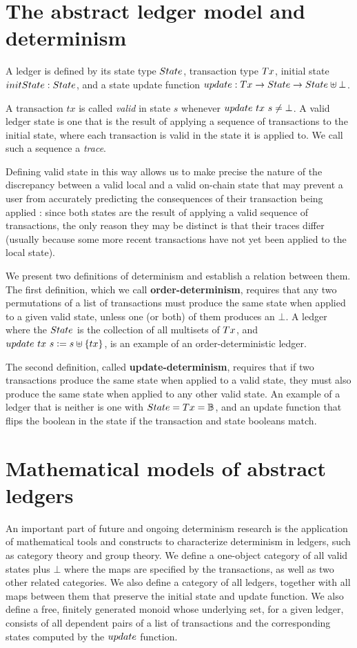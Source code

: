 \section{The abstract ledger model and determinism}
\label{sec:the-model}
A ledger is defined by its state type $\State$, transaction
type $\Tx$, initial state $\fun{initState} : \State$,
and a state update function $\ups : \Tx \to \State \to \State \uplus \bot$.

A transaction $tx$ is called \emph{valid} in state $s$ whenever $\ups\ tx\ s \neq \bot$.
A valid ledger state is one that is the result
of applying a sequence of transactions to the initial state, where each transaction
is valid in the state it is applied to. We call such a sequence a \emph{trace}.

Defining valid state in this way allows us to make precise the nature of the
discrepancy between a valid local and a valid on-chain state that may prevent a
user from accurately predicting the consequences of their transaction being applied :
since both states are the result of applying a valid sequence of transactions,
the only reason they may be distinct is that their traces differ (usually because
some more recent transactions have not yet been applied to the local state).

We present two definitions of determinism and establish a relation between them. The first definition,
which we call \textbf{order-determinism}, requires that
any two permutations of a list of transactions must produce the same state when
applied to a given valid state, unless one (or both) of them produces an $\bot$.
A ledger where the $\State$ is the collection of all multisets of $\Tx$,
and $\ups~tx~s \leteq s \uplus \{tx\}$, is
an example of an order-deterministic ledger.

The second definition, called \textbf{update-determinism}, requires that if two
transactions produce the same state
when applied to a valid state, they must also produce the same state when applied
to any other valid state. An example of a
ledger that is neither is one with $\State = \Tx = \B$,
and an update function that flips the boolean in the state if the transaction and
state booleans match.


\section{Mathematical models of abstract ledgers}
\label{sec:math}

An important part of future and ongoing determinism research is the application of
mathematical tools and constructs to characterize determinism in ledgers,
such as category theory and group theory.
We define a one-object category of all valid states plus $\bot$
where the maps are specified by the transactions, as well as
two other related categories.
We also define a category of all ledgers, together with all maps between them that preserve the initial
state and update function.
We also define a free, finitely generated monoid whose underlying set, for a given ledger,
consists of all dependent pairs of a list of transactions and the corresponding states computed by the $\ups$ function.

